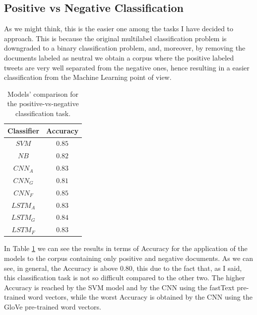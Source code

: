 \documentclass[11pt,twocolumn]{article}
\begin{document}
        \subsection{Positive vs Negative Classification} %
        \label{sub:positive_vs_negative_classification}
            As we might think, this is the easier one among the tasks I have decided to approach. This is
            because the original multilabel classification problem is downgraded to a binary classification
            problem, and, moreover, by removing the documents labeled as neutral we obtain a corpus where
            the positive labeled tweets are very well separated from the negative ones, hence resulting in
            a easier classification from the Machine Learning point of view.

                \begin{table}[h]
                     \centering
                     \begin{tabular}{| c | c |}
                        \hline
                        \textbf{Classifier} & \textbf{Accuracy} \\
                        \hline
                        $SVM$ & $0.85$ \\
                        \hline
                        $NB$ & $0.82$ \\
                        \hline
                        $CNN_A$ & $0.83$ \\
                        \hline
                        $CNN_G$ & $0.81$ \\
                        \hline
                        $CNN_F$ & $0.85$ \\
                        \hline
                        $LSTM_A$ & $0.83$ \\
                        \hline
                        $LSTM_G$ & $0.84$ \\
                        \hline
                        $LSTM_F$ & $0.83$ \\
                        \hline
                    \end{tabular}
                    \caption{Models' comparison for the positive-vs-negative classification task.}
                    \label{tab:pn_comparison}
                \end{table}

            \noindent
            In Table \ref{tab:pn_comparison} we can see the results in terms of Accuracy for the application
            of the models to the corpus containing only positive and negative documents. As we can see, in
            general, the Accuracy is above $0.80$, this due to the fact that, as I said, this
            classification task is not so difficult compared to the other two. The higher Accuracy is
            reached by the SVM model and by the CNN using the fastText pre-trained word vectors, while the
            worst Accuracy is obtained by the CNN using the GloVe pre-trained word vectors.
\end{document}
